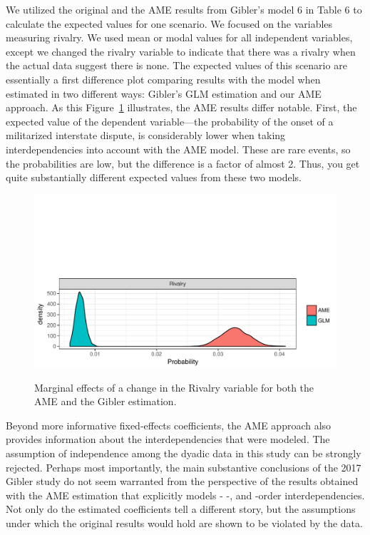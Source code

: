 We utilized the original and the AME results from Gibler's model 6 in Table 6 to calculate the expected values for one scenario. We focused on the variables measuring rivalry.  We used mean or modal values for all independent variables, except we changed the rivalry variable to indicate that there was a rivalry when the actual data suggest there is none.  The expected values of this scenario are essentially a first difference plot comparing results with the model when estimated in two different ways: Gibler's GLM estimation and our AME approach.  As this Figure~\ref{fig:gibmargeff} illustrates, the AME results differ notable. First, the expected value of the dependent variable---the probability of the onset of a militarized interstate dispute, is considerably lower when taking interdependencies into account with the AME model.  These are rare events, so the probabilities are low, but the difference is a factor of almost 2. Thus, you get quite substantially different expected values from these two models.  

\begin{figure}
	\caption{Marginal effects of a change in the Rivalry variable for both the AME and the Gibler estimation.  \label{fig:gibmargeff}}
	\includegraphics[width=\textwidth]{gibler_margeff.pdf}
 	\label{fig:gibmargeff}
 \end{figure}

Beyond more informative fixed-effects coefficients, the AME approach also provides information about the interdependencies that were modeled. The assumption of independence among the dyadic data in this study can be strongly rejected. Perhaps most importantly, the main substantive conclusions of the 2017 Gibler study do not seem warranted from the perspective of the results obtained with the AME estimation that explicitly models \first- \second-, and \third-order interdependencies. Not only do the estimated coefficients tell a different story, but the assumptions under which the original results would hold are shown to be violated by the data.

